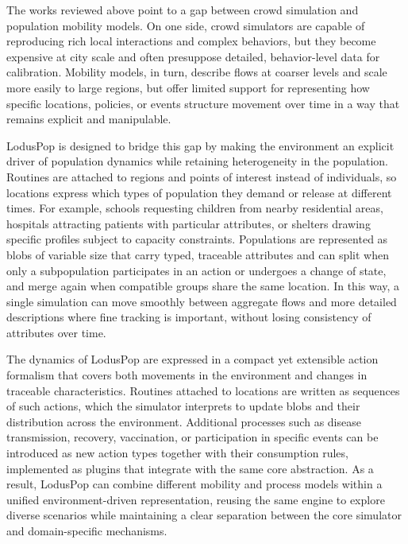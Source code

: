 \documentclass[pdflatex,sn-mathphys-num]{sn-jnl}%
\newcommand\redb[1]{#1}
\theoremstyle{thmstyleone}%
\theoremstyle{thmstyletwo}%
\theoremstyle{thmstylethree}%
\begin{document}
\redb{The works reviewed above point to a gap between crowd simulation and population mobility models. On one side, crowd simulators are capable of reproducing rich local interactions and complex behaviors, but they become expensive at city scale and often presuppose detailed, behavior-level data for calibration. Mobility models, in turn, describe flows at coarser levels and scale more easily to large regions, but offer limited support for representing how specific locations, policies, or events structure movement over time in a way that remains explicit and manipulable.

LodusPop is designed to bridge this gap by making the environment an explicit driver of population dynamics while retaining heterogeneity in the population. Routines are attached to regions and points of interest instead of individuals, so locations express which types of population they demand or release at different times. For example, schools requesting children from nearby residential areas, hospitals attracting patients with particular attributes, or shelters drawing specific profiles subject to capacity constraints. 
Populations are represented as blobs of variable size that carry typed, traceable attributes and can split when only a subpopulation participates in an action or undergoes a change of state, and merge again when compatible groups share the same location. In this way, a single simulation can move smoothly between aggregate flows and more detailed descriptions where fine tracking is important, without losing consistency of attributes over time.

The dynamics of LodusPop are expressed in a compact yet extensible action formalism that covers both movements in the environment and changes in traceable characteristics. 
Routines attached to locations are written as sequences of such actions, which the simulator interprets to update blobs and their distribution across the environment. 
Additional processes such as disease transmission, recovery, vaccination, or participation in specific events can be introduced as new action types together with their consumption rules, implemented as plugins that integrate with the same core abstraction. 
As a result, LodusPop can combine different mobility and process models within a unified environment-driven representation, reusing the same engine to explore diverse scenarios while maintaining a clear separation between the core simulator and domain-specific mechanisms.
}
\end{document}
